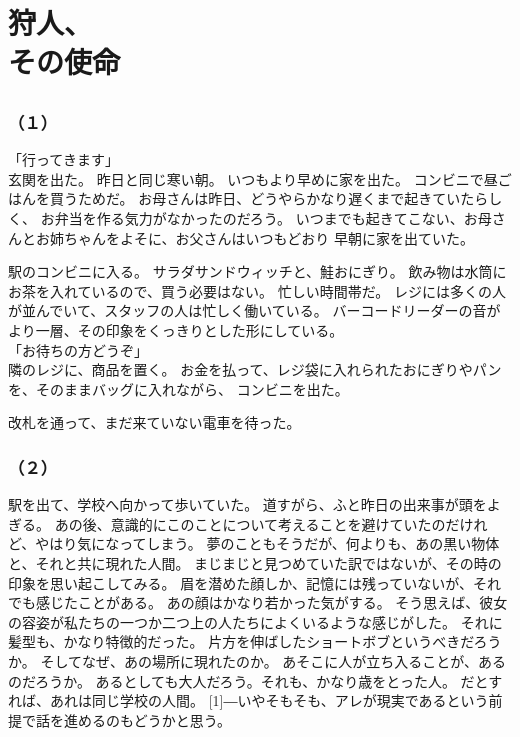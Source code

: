 \documentclass[../IHMain]{subfiles}
\begin{document}
    
\chapter{狩人、\\その使命}

\section{}
\subsection*{（１）}
「行ってきます」\\
玄関を出た。
昨日と同じ寒い朝。
いつもより早めに家を出た。
コンビニで昼ごはんを買うためだ。
お母さんは昨日、どうやらかなり遅くまで起きていたらしく、
お弁当を作る気力がなかったのだろう。
いつまでも起きてこない、お母さんとお姉ちゃんをよそに、お父さんはいつもどおり
早朝に家を出ていた。

駅のコンビニに入る。
サラダサンドウィッチと、鮭おにぎり。
飲み物は水筒にお茶を入れているので、買う必要はない。
忙しい時間帯だ。
レジには多くの人が並んでいて、スタッフの人は忙しく働いている。
バーコードリーダーの音がより一層、その印象をくっきりとした形にしている。\\
「お待ちの方どうぞ」\\
隣のレジに、商品を置く。
お金を払って、レジ袋に入れられたおにぎりやパンを、そのままバッグに入れながら、
コンビニを出た。

改札を通って、まだ来ていない電車を待った。

\subsection*{（２）}
駅を出て、学校へ向かって歩いていた。
道すがら、ふと昨日の出来事が頭をよぎる。
あの後、意識的にこのことについて考えることを避けていたのだけれど、やはり気になってしまう。
夢のこともそうだが、何よりも、あの黒い物体と、それと共に現れた人間。
まじまじと見つめていた訳ではないが、その時の印象を思い起こしてみる。
眉を潜めた顔しか、記憶には残っていないが、それでも感じたことがある。
あの顔はかなり若かった気がする。
そう思えば、彼女の容姿が私たちの一つか二つ上の人たちによくいるような感じがした。
それに髪型も、かなり特徴的だった。
片方を伸ばしたショートボブというべきだろうか。
そしてなぜ、あの場所に現れたのか。
あそこに人が立ち入ることが、あるのだろうか。
あるとしても大人だろう。それも、かなり歳をとった人。
だとすれば、あれは同じ学校の人間。
\scalebox{3}[1]{―}いやそもそも、アレが現実であるという前提で話を進めるのもどうかと思う。
\end{document}
